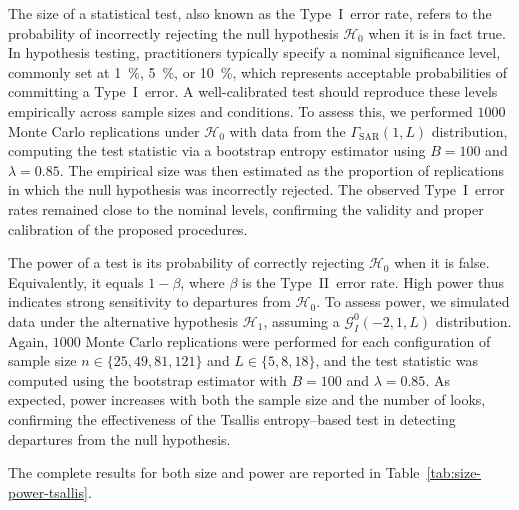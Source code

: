 \documentclass[
  lettersize  journal,
]{IEEEtran}%
\begin{document}
The size of a statistical test, also known as the Type~I~error rate,
refers to the probability of incorrectly rejecting the null hypothesis
\(\mathcal{H}_0\) when it is in fact true. In hypothesis testing,
practitioners typically specify a nominal significance level, commonly
set at \SI{1}{\percent}, \SI{5}{\percent}, or \SI{10}{\percent}, which
represents acceptable probabilities of committing a Type~I~error. A
well-calibrated test should reproduce these levels empirically across
sample sizes and conditions. To assess this, we performed \(1000\) Monte
Carlo replications under \(\mathcal{H}_0\) with data from the
\(\Gamma_{\mathrm{SAR}}(1,L)\) distribution, computing the test
statistic via a bootstrap entropy estimator using \(B=100\) and
\(\lambda=0.85\). The empirical size was then estimated as the
proportion of replications in which the null hypothesis was incorrectly
rejected. The observed Type~I~error rates remained close to the nominal
levels, confirming the validity and proper calibration of the proposed
procedures.

The power of a test is its probability of correctly rejecting
\(\mathcal{H}_0\) when it is false. Equivalently, it equals \(1-\beta\),
where \(\beta\) is the Type~II~error rate. High power thus indicates
strong sensitivity to departures from \(\mathcal{H}_0\). To assess
power, we simulated data under the alternative hypothesis
\(\mathcal{H}_1\), assuming a \(\mathcal{G}^0_I(-2,1,L)\) distribution.
Again, \(1000\) Monte Carlo replications were performed for each
configuration of sample size \(n \in \{25, 49, 81, 121\}\) and
\(L \in \{5, 8, 18\}\), and the test statistic was computed using the
bootstrap estimator with \(B=100\) and \(\lambda=0.85\). As expected,
power increases with both the sample size and the number of looks,
confirming the effectiveness of the Tsallis entropy--based test in
detecting departures from the null hypothesis.

The complete results for both size and power are reported in
Table~\ref{tab:size-power-tsallis}.

\renewcommand{\arraystretch}{1}
\end{document}
